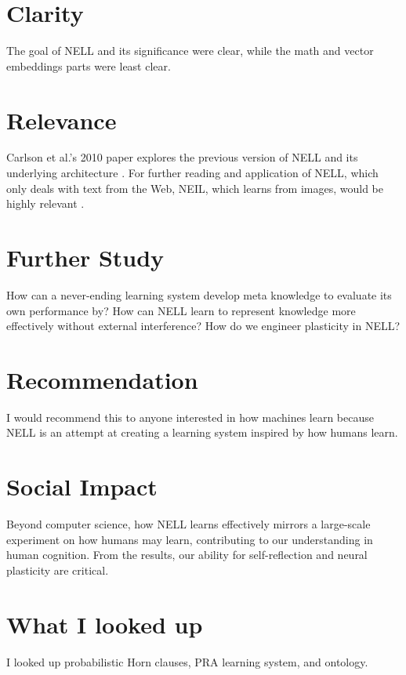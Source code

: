 \documentclass[12pt, letterpaper]{article}
\begin{document}

\section{Clarity}
\label{sec:clarity}
The goal of NELL and its significance were clear, while the math and vector embeddings parts were least clear.

\section{Relevance}
\label{sec:relevance}
Carlson et al.'s 2010 paper explores the previous version of NELL and its underlying architecture \cite{Architecture}. For further reading and application of NELL, which only deals with text from the Web, NEIL, which learns from images, would be highly relevant \cite{NEIL}.

\section{Further Study}
\label{sec:further}
How can a never-ending learning system develop meta knowledge to evaluate its own performance by? How can NELL learn to represent knowledge more effectively without external interference? How do we engineer plasticity in NELL?

\section{Recommendation}
\label{sec:rec}
I would recommend this to anyone interested in how machines learn because NELL is an attempt at creating a learning system inspired by how humans learn.

\section{Social Impact}
\label{sec:impact}
Beyond computer science, how NELL learns effectively mirrors a large-scale experiment on how humans may learn, contributing to our understanding in human cognition. From the results, our ability for self-reflection and neural plasticity are critical.

\section{What I looked up}
\label{sec:looked up}
I looked up probabilistic Horn clauses, PRA learning system, and ontology.


\end{document}
